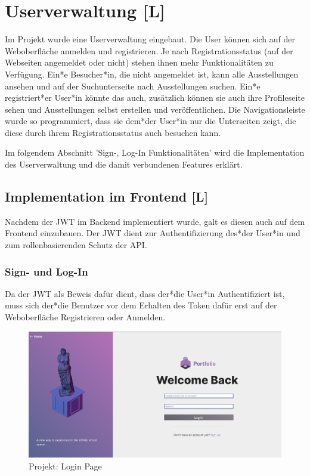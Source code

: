 \section{Userverwaltung [L]}
Im Projekt wurde eine Userverwaltung eingebaut. Die User können sich auf der Weboberfläche anmelden und registrieren. Je nach Registrationsstatus (auf der Webseiten angemeldet oder nicht) stehen ihnen mehr Funktionalitäten zu Verfügung. Ein*e Besucher*in, die nicht angemeldet ist, kann alle Ausstellungen ansehen und auf der Suchunterseite nach Ausstellungen suchen. Ein*e registriert*er User*in könnte das auch, zusätzlich können sie auch ihre Profileseite sehen und Ausstellungen selbst erstellen und veröffentlichen. Die Navigationsleiste wurde so programmiert, dass sie dem*der User*in nur die Unterseiten zeigt, die diese durch ihrem Registrationsstatus auch besuchen kann. 

Im folgendem Abschnitt 'Sign-, Log-In Funktionalitäten' wird die Implementation des Userverwaltung und die damit verbundenen Features erklärt. 

\subsection{Implementation im Frontend [L]}
Nachdem der JWT im Backend implementiert wurde, galt es diesen auch auf dem Frontend einzubauen. Der JWT dient zur Authentifizierung des*der User*in und zum rollenbasierenden Schutz der API. 

\subsubsection{Sign- und Log-In}
Da der JWT als Beweis dafür dient, dass der*die User*in Authentifiziert ist, muss sich der*die Benutzer vor dem Erhalten des Token dafür erst auf der Weboberfläche Registrieren oder Anmelden. 

\begin{figure}
    \centering
    \includegraphics[scale=0.25]{pics/GalleryLogIn.png}
    \caption{Projekt: Login Page}
    \label{fig:impl:login}
\end{figure}

